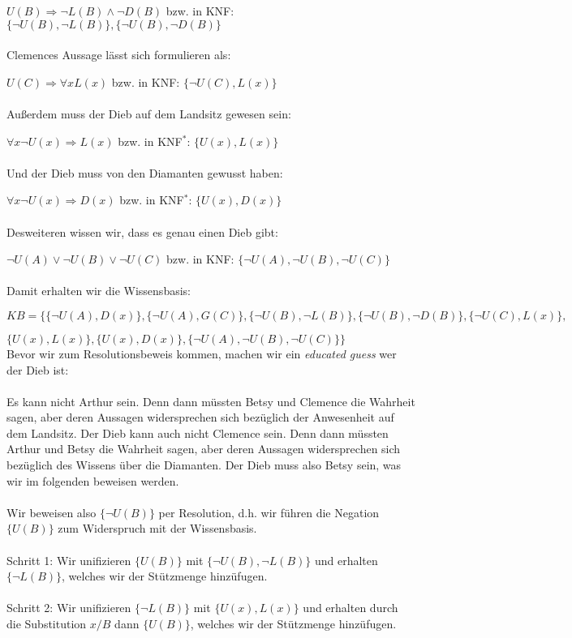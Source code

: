 \documentclass[a4paper]{article}
\begin{document}
$U(B) \Rightarrow \neg L(B) \land \neg D(B)$ bzw. in KNF: $\{\neg U(B), \neg L(B)\}, \{\neg U(B), \neg D(B)\}$\\
\\
Clemences Aussage l\"asst sich formulieren als:

$U(C) \Rightarrow \forall x L(x)$ bzw. in KNF: $\{\neg U(C), L(x)\}$\\
\\
Au{\ss}erdem muss der Dieb auf dem Landsitz gewesen sein: 

$\forall x \neg U(x) \Rightarrow L(x)$ bzw. in KNF$^\ast$: $\{ U(x), L(x)\}$\\
\\
Und der Dieb muss von den Diamanten gewusst haben:

$\forall x \neg U(x) \Rightarrow D(x)$ bzw. in KNF$^\ast$: $\{ U(x), D(x)\}$\\
\\
Desweiteren wissen wir, dass es genau einen Dieb gibt:

$\neg U(A) \lor \neg U(B) \lor \neg U(C)$ bzw. in KNF: $\{ \neg U(A), \neg U(B), \neg U(C)\}$\\
\\
Damit erhalten wir die Wissensbasis:

$KB = \{\{\neg U(A), D(x)\}, \{\neg U(A), G(C)\}, \{\neg U(B), \neg L(B)\}, \{\neg U(B), \neg D(B)\}, \{\neg U(C), L(x)\},$

			  $\{ U(x), L(x)\}, \{ U(x), D(x)\}, \{ \neg U(A), \neg U(B), \neg U(C)\}\}$\\
			  
Bevor wir zum Resolutionsbeweis kommen, machen wir ein \textit{educated guess} wer der Dieb ist:\\
\\
Es kann nicht Arthur sein. Denn dann m\"ussten Betsy und Clemence die Wahrheit sagen, aber deren Aussagen widersprechen sich bez\"uglich der Anwesenheit auf dem Landsitz. Der Dieb kann auch nicht Clemence sein. Denn dann m\"ussten Arthur und Betsy die Wahrheit sagen, aber deren Aussagen widersprechen sich bez\"uglich des Wissens \"uber die Diamanten. Der Dieb muss also Betsy sein, was wir im folgenden beweisen werden.\\
\\
Wir beweisen also $\{\neg U(B)\}$ per Resolution, d.h. wir f\"uhren die Negation $\{U(B)\}$ zum Widerspruch mit der Wissensbasis.\\
\\
Schritt 1: Wir unifizieren $\{U(B)\}$ mit $\{\neg U(B), \neg L(B)\}$ und erhalten $\{\neg L(B)\}$, welches wir der St\"utzmenge hinz\"ufugen.\\
\\
Schritt 2: Wir unifizieren $\{\neg L(B)\}$ mit $\{ U(x), L(x)\}$ und erhalten durch die Substitution $x/B$ dann $\{ U(B)\}$, welches wir der St\"utzmenge hinz\"ufugen.\\
\end{document}
